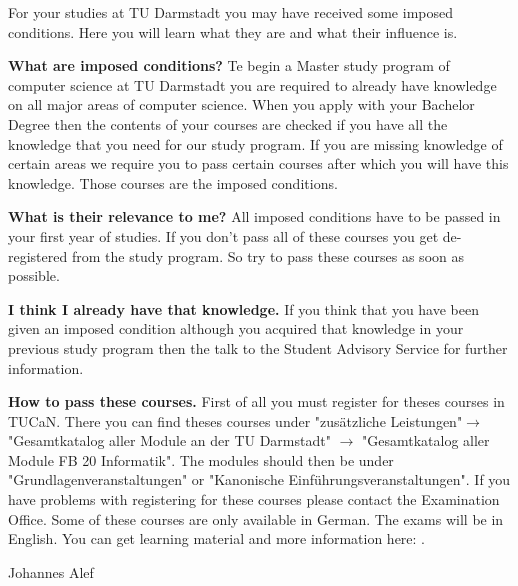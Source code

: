 {For your studies at TU Darmstadt you may have received some imposed conditions. Here you will learn what they are and what their influence is.
}{\noindent\textbf{What are imposed conditions?}
    Te begin a Master study program of computer science at TU Darmstadt you are required to already have knowledge on all major areas of computer science.
    When you apply with your Bachelor Degree then the contents of your courses are checked if you have all the knowledge that you need for our study program.
    If you are missing knowledge of certain areas we require you to pass certain courses after which you will have this knowledge.
    Those courses are the imposed conditions.

    \noindent\textbf{What is their relevance to me?}
    All imposed conditions have to be passed in your first year of studies.
    If you don't pass all of these courses you get de-registered from the study program.
    So try to pass these courses as soon as possible.

    \noindent\textbf{I think I already have that knowledge.}
    If you think that you have been given an imposed condition although you acquired that knowledge in your previous study program then the talk to the Student Advisory Service for further information.

    \noindent\textbf{How to pass these courses.}
    First of all you must register for theses courses in TUCaN.
    There you can find theses courses under "zusätzliche Leistungen"$\rightarrow$"Gesamtkatalog aller Module an der TU Darmstadt" $\rightarrow$ "Gesamtkatalog aller Module FB 20 Informatik".
    The modules should then be under "Grundlagenveranstaltungen" or "Kanonische Einführungsveranstaltungen".
    If you have problems with registering for these courses please contact the Examination Office.
    Some of these courses are only available in German.
    The exams will be in English.
    You can get learning material and more information here: \footnotemark[1].



}{Johannes Alef}

